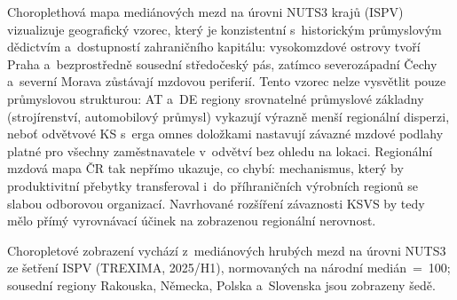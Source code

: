 Choroplethová mapa mediánových mezd na úrovni NUTS3 krajů (\ac{ISPV}) vizualizuje geografický vzorec, který je konzistentní s~historickým průmyslovým dědictvím a~dostupností zahraničního kapitálu: vysokomzdové ostrovy tvoří Praha a~bezprostředně sousední středočeský pás, zatímco severozápadní Čechy a~severní Morava zůstávají mzdovou periferií.
Tento vzorec nelze vysvětlit pouze průmyslovou strukturou: AT a~DE regiony srovnatelné průmyslové základny (strojírenství, automobilový průmysl) vykazují výrazně menší regionální disperzi, neboť odvětvové \ac{KS} s~erga omnes doložkami nastavují závazné mzdové podlahy platné pro všechny zaměstnavatele v~odvětví bez ohledu na lokaci.
Regionální mzdová mapa ČR tak nepřímo ukazuje, co chybí: mechanismus, který by produktivitní přebytky transferoval i~do příhraničních výrobních regionů se slabou odborovou organizací.
Navrhované rozšíření závaznosti \ac{KSVS} by tedy mělo přímý vyrovnávací účinek na zobrazenou regionální nerovnost.

Choropletové zobrazení vychází z~mediánových hrubých mezd na úrovni \acs{NUTS}3 ze šetření \acs{ISPV} (TREXIMA, 2025/H1), normovaných na národní medián~=~100; sousední regiony Rakouska, Německa, Polska a~Slovenska jsou zobrazeny šedě.\par


